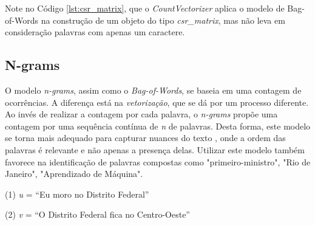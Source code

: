 Note no Código \ref{lst:csr_matrix}, que o \textit{CountVectorizer} aplica o modelo de Bag-of-Words na construção de um objeto do tipo \textit{csr\_matrix}, mas não leva em consideração palavras com apenas um caractere.

\subsection{N-grams}

O modelo \textit{n-grams}, assim como o \textit{Bag-of-Words}, se baseia em uma contagem de ocorrências. A diferença está na \textit{vetorização}, que se dá por um processo diferente. Ao invés de realizar a contagem por cada palavra, o \textit{n-grams} propõe uma contagem por uma sequência contínua de \textit{n} de palavras. Desta forma, este modelo se torna mais adequado para capturar nuances do texto \cite{Lundborg_2017}, onde a ordem das palavras é relevante e não apenas a presença delas. Utilizar este modelo também favorece na identificação de palavras compostas como "primeiro-ministro", "Rio de Janeiro", "Aprendizado de Máquina".

\begin{samepage}
(1) \textit{u} = “Eu moro no Distrito Federal”

\nopagebreak

(2) \textit{v} = “O Distrito Federal fica no Centro-Oeste”
\end{samepage}

